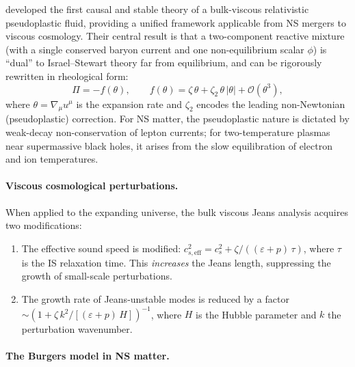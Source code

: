 \citet{GavassinoNoronhaRheology2023} developed the first causal and
stable theory of a bulk-viscous relativistic pseudoplastic fluid,
providing a unified framework applicable from NS mergers to viscous
cosmology.  Their central result is that a two-component reactive
mixture (with a single conserved baryon current and one non-equilibrium
scalar $\phi$) is ``dual'' to Israel--Stewart theory far from
equilibrium, and can be rigorously rewritten in rheological form:
\begin{equation}
\label{eq:rel-13-rheological}
\Pi = -f(\theta),
\qquad
f(\theta) = \zeta\,\theta
  + \zeta_{2}\,\theta\,|\theta|
  + \mathcal{O}(\theta^{3}),
\end{equation}
where $\theta = \nabla_{\mu}u^{\mu}$ is the expansion rate and
$\zeta_{2}$ encodes the leading non-Newtonian (pseudoplastic)
correction.  For NS matter, the pseudoplastic nature is dictated by
weak-decay non-conservation of lepton currents; for two-temperature
plasmas near supermassive black holes, it arises from the slow
equilibration of electron and ion temperatures.

\paragraph{Viscous cosmological perturbations.}
When applied to the expanding universe, the bulk viscous Jeans
analysis acquires two modifications:
\begin{enumerate}
\item The effective sound speed is modified:
  $c_{s,\mathrm{eff}}^{2} = c_{s}^{2} + \zeta/((\varepsilon+p)\,\tau)$,
  where $\tau$ is the IS relaxation time.  This \emph{increases} the
  Jeans length, suppressing the growth of small-scale perturbations.

\item The growth rate of Jeans-unstable modes is reduced by a factor
  $\sim (1 + \zeta\,k^{2}/[(\varepsilon+p)\,H])^{-1}$, where $H$ is
  the Hubble parameter and $k$ the perturbation wavenumber.
\end{enumerate}

\paragraph{The Burgers model in NS matter.}
\label{sec:rel-13-burgers}

